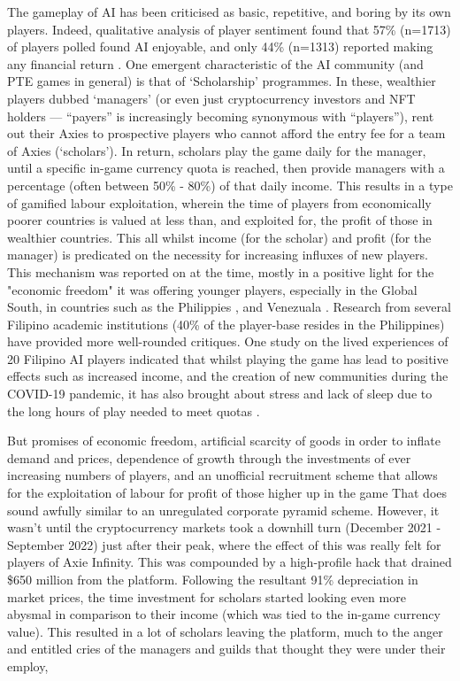 The gameplay of AI has been criticised as basic, repetitive, and boring by its own players. Indeed, qualitative analysis of player sentiment found that 57\% (n=1713) of players polled found AI enjoyable, and only 44\% (n=1313) reported making any financial return \citep[]{delic2022}. One emergent characteristic of the AI community (and PTE games in general) is that of ‘Scholarship’ programmes. In these, wealthier players dubbed ‘managers’ (or even just cryptocurrency investors and NFT holders — “payers” is increasingly becoming synonymous with “players”), rent out their Axies to prospective players who cannot afford the entry fee for a team of Axies (‘scholars’). In return, scholars play the game daily for the manager, until a specific in-game currency quota is reached, then provide managers with a percentage (often between 50\% - 80\%) of that daily income. This results in a type of gamified labour exploitation, wherein the time of players from economically poorer countries is valued at less than, and exploited for, the profit of those in wealthier countries. This all whilst income (for the scholar) and profit (for the manager) is predicated on the necessity for increasing influxes of new players. This mechanism was reported on at the time, mostly in a positive light for the "economic freedom" it was offering younger players, especially in the Global South, in countries such as the Philippies \citep[]{puyat2021}, and Venezuala \citep[]{ledesma2021}. Research from several Filipino academic institutions (40\% of the player-base resides in the Philippines) have provided more well-rounded critiques. One study on the lived experiences of 20 Filipino AI players indicated that whilst playing the game has lead to positive effects such as increased income, and the creation of new communities during the COVID-19 pandemic, it has also brought about stress and lack of sleep due to the long hours of play needed to meet quotas \citep[]{dejesus2022}.

But promises of economic freedom, artificial scarcity of goods in order to inflate demand and prices, dependence of growth through the investments of ever increasing numbers of players, and an unofficial recruitment scheme that allows for the exploitation of labour for profit of those higher up in the game\textinterrobang\xspace That does sound awfully similar to an unregulated corporate pyramid scheme. However, it wasn't until the cryptocurrency markets took a downhill turn (December 2021 - September 2022) just after their peak, where the effect of this was really felt for players of Axie Infinity. This was compounded by a high-profile hack that drained \$650 million from the platform. Following the resultant 91\% depreciation in market prices, the time investment for scholars started looking even more abysmal in comparison to their income (which was tied to the in-game currency value). This resulted in a lot of scholars leaving the platform, much to the anger and entitled cries of the managers and guilds that thought they were under their employ, \citep[]{ongwesojr.2022,gach2022}

